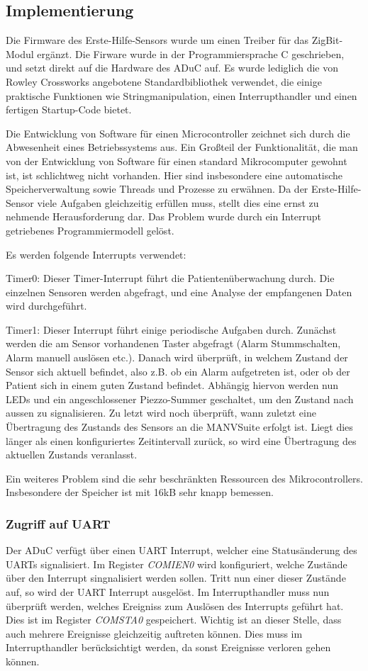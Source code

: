 \subsection{Implementierung}
Die Firmware des Erste-Hilfe-Sensors wurde um einen Treiber für das ZigBit-Modul ergänzt. Die Firware wurde in der
Programmiersprache C geschrieben, und setzt direkt auf die Hardware des ADuC auf. Es wurde lediglich die von 
Rowley Crossworks angebotene Standardbibliothek verwendet, die einige praktische Funktionen wie Stringmanipulation,
einen Interrupthandler und einen fertigen Startup-Code bietet.

Die Entwicklung von Software für einen Microcontroller zeichnet sich durch die Abwesenheit eines Betriebssystems 
aus. Ein Großteil der Funktionalität, die man von der Entwicklung von Software für einen standard Mikrocomputer 
gewohnt ist, ist schlichtweg nicht vorhanden. Hier sind insbesondere eine automatische Speicherverwaltung sowie
Threads und Prozesse zu erwähnen. Da der Erste-Hilfe-Sensor viele Aufgaben gleichzeitig erfüllen muss, stellt 
dies eine ernst zu nehmende Herausforderung dar. Das Problem wurde durch ein Interrupt getriebenes Programmiermodell
gelöst.

Es werden folgende Interrupts verwendet:

Timer0: Dieser Timer-Interrupt führt die Patientenüberwachung durch. Die einzelnen Sensoren werden abgefragt,
und eine Analyse der empfangenen Daten wird durchgeführt.

Timer1: Dieser Interrupt führt einige periodische Aufgaben durch. Zunächst werden die am Sensor vorhandenen
Taster abgefragt (Alarm Stummschalten, Alarm manuell auslösen etc.). Danach wird überprüft, in welchem Zustand
der Sensor sich aktuell befindet, also z.B. ob ein Alarm aufgetreten ist, oder ob der Patient sich in einem
guten Zustand befindet. Abhängig hiervon werden nun LEDs und ein angeschlossener Piezzo-Summer geschaltet,
um den Zustand nach aussen zu signalisieren. Zu letzt wird noch überprüft, wann zuletzt eine Übertragung
des Zustands des Sensors an die MANVSuite erfolgt ist. Liegt dies länger als einen konfiguriertes Zeitintervall
zurück, so wird eine Übertragung des aktuellen Zustands veranlasst.

Ein weiteres Problem sind die sehr beschränkten Ressourcen des Mikrocontrollers. Insbesondere der Speicher ist
mit 16kB sehr knapp bemessen. 


\subsubsection{Zugriff auf UART}
Der ADuC verfügt über einen UART Interrupt, welcher eine Statusänderung des UARTs signalisiert. Im Register 
\textsl{COMIEN0} wird konfiguriert, welche Zustände über den Interrupt singnalisiert werden sollen. Tritt
nun einer dieser Zustände auf, so wird der UART Interrupt ausgelöst. Im Interrupthandler muss nun überprüft
werden, welches Ereigniss zum Auslösen des Interrupts geführt hat. Dies ist im Register \textsl{COMSTA0} 
gespeichert. Wichtig ist an dieser Stelle, dass auch mehrere Ereignisse gleichzeitig auftreten können. 
Dies muss im Interrupthandler berücksichtigt werden, da sonst Ereignisse verloren gehen können.


